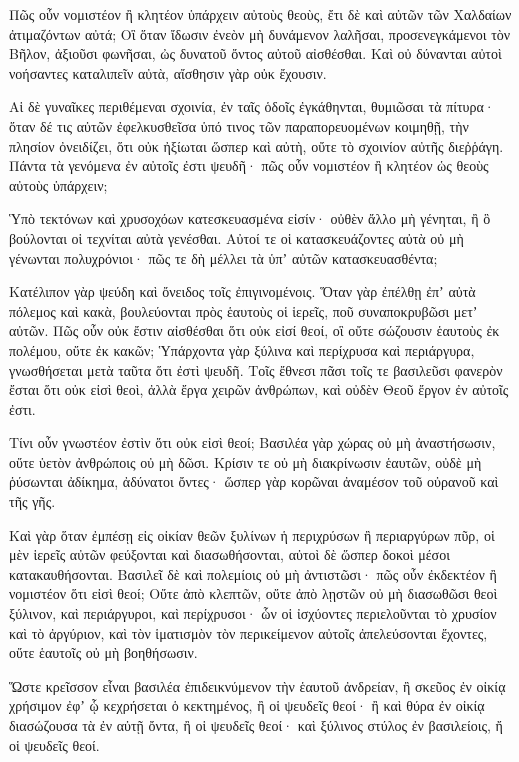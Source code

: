 {\par }{\PP {}Πῶς οὖν νομιστέον ἢ κλητέον ὑπάρχειν αὐτοὺς θεοὺς, ἔτι δὲ καὶ αὐτῶν τῶν Χαλδαίων ἀτιμαζόντων αὐτά;
Οἳ ὅταν ἴδωσιν ἐνεὸν μὴ δυνάμενον λαλῆσαι, προσενεγκάμενοι τὸν Βῆλον, ἀξιοῦσι φωνῆσαι, ὠς δυνατοῦ ὄντος αὐτοῦ αἰσθέσθαι.
Καὶ οὐ δύνανται αὐτοὶ νοήσαντες καταλιπεῖν αὐτὰ, αἴσθησιν γὰρ οὐκ ἔχουσιν.
\par }{\PP {}Αἱ δὲ γυναῖκες περιθέμεναι σχοινία, ἐν ταῖς ὁδοῖς ἐγκάθηνται, θυμιῶσαι τὰ πίτυρα· ὅταν δέ τις αὐτῶν ἐφελκυσθεῖσα ὑπό τινος τῶν παραπορευομένων κοιμηθῇ, τὴν πλησίον ὀνειδίζει, ὅτι οὐκ ἠξίωται ὥσπερ καὶ αὐτὴ, οὔτε τὸ σχοινίον αὐτῆς διεῤῥάγη.
Πάντα τὰ γενόμενα ἐν αὐτοῖς ἐστι ψευδῆ· πῶς οὖν νομιστέον ἢ κλητέον ὡς θεοὺς αὐτοὺς ὑπάρχειν;
\par }{\PP {}Ὑπὸ τεκτόνων καὶ χρυσοχόων κατεσκευασμένα εἰσίν· οὐθὲν ἄλλο μὴ γένηται, ἢ ὃ βούλονται οἱ τεχνίται αὐτὰ γενέσθαι.
Αὐτοί τε οἱ κατασκευάζοντες αὐτὰ οὐ μὴ γένωνται πολυχρόνιοι· πῶς τε δὴ μέλλει τὰ ὑπʼ αὐτῶν κατασκευασθέντα;
\par }{\PP {}Κατέλιπον γὰρ ψεύδη καὶ ὄνειδος τοῖς ἐπιγινομένοις.
Ὅταν γὰρ ἐπέλθῃ ἐπʼ αὐτὰ πόλεμος καὶ κακὰ, βουλεύονται πρὸς ἑαυτοὺς οἱ ἱερεῖς, ποῦ συναποκρυβῶσι μετʼ αὐτῶν.
Πῶς οὖν οὐκ ἔστιν αἰσθέσθαι ὅτι οὐκ εἰσί θεοί, οἳ οὔτε σώζουσιν ἑαυτοὺς ἐκ πολέμου, οὔτε ἐκ κακῶν;
Ὑπάρχοντα γὰρ ξύλινα καὶ περίχρυσα καὶ περιάργυρα, γνωσθήσεται μετὰ ταῦτα ὅτι ἐστὶ ψευδῆ.
Τοῖς ἔθνεσι πᾶσι τοῖς τε βασιλεῦσι φανερὸν ἔσται ὅτι οὐκ εἰσὶ θεοὶ, ἀλλὰ ἔργα χειρῶν ἀνθρώπων, καὶ οὐδὲν Θεοῦ ἔργον ἐν αὐτοῖς ἐστι.
\par }{\PP {}Τίνι οὖν γνωστέον ἐστὶν ὅτι οὐκ εἰσὶ θεοί;
Βασιλέα γὰρ χώρας οὐ μὴ ἀναστήσωσιν, οὔτε ὑετὸν ἀνθρώποις οὐ μὴ δῶσι.
Κρίσιν τε οὐ μὴ διακρίνωσιν ἑαυτῶν, οὐδὲ μὴ ῥύσωνται ἀδίκημα, ἀδύνατοι ὄντες· ὥσπερ γὰρ κορῶναι ἀναμέσον τοῦ οὐρανοῦ καὶ τῆς γῆς.
\par }{\PP {}Καὶ γὰρ ὅταν ἐμπέσῃ εἰς οἰκίαν θεῶν ξυλίνων ἡ περιχρύσων ἢ περιαργύρων πῦρ, οἱ μὲν ἱερεῖς αὐτῶν φεύξονται καὶ διασωθήσονται, αὐτοὶ δὲ ὥσπερ δοκοὶ μέσοι κατακαυθήσονται.
Βασιλεῖ δὲ καὶ πολεμίοις οὐ μὴ ἀντιστῶσι· πῶς οὖν ἐκδεκτέον ἢ νομιστέον ὅτι εἰσὶ θεοί;
Οὔτε ἀπὸ κλεπτῶν, οὔτε ἀπὸ λῃστῶν οὐ μὴ διασωθῶσι θεοὶ ξύλινον, καὶ περιάργυροι, καὶ περίχρυσοι·
ὧν οἱ ἰσχύοντες περιελοῦνται τὸ χρυσίον καὶ τὸ ἀργύριον, καὶ τὸν ἱματισμὸν τὸν περικείμενον αὐτοῖς ἀπελεύσονται ἔχοντες, οὔτε ἑαυτοῖς οὐ μὴ βοηθήσωσιν.
\par }{\PP {}Ὥστε κρεῖσσον εἶναι βασιλέα ἐπιδεικνύμενον τὴν ἑαυτοῦ ἀνδρείαν, ἢ σκεῦος ἐν οἰκίᾳ χρήσιμον ἐφʼ ᾧ κεχρήσεται ὁ κεκτημένος, ἢ οἱ ψευδεῖς θεοί· ἢ καὶ θύρα ἐν οἰκίᾳ διασώζουσα τὰ ἐν αὐτῇ ὄντα, ἢ οἱ ψευδεῖς θεοί· καὶ ξύλινος στύλος ἐν βασιλείοις, ἤ οἱ ψευδεῖς θεοί.
}
